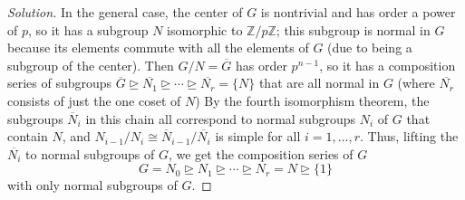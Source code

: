 \documentclass[10pt]{article}
\providecommand{\ol}{\overline}
\providecommand{\ZZ}{\mathbb Z}
\newenvironment{soln}{\begin{proof}[Solution]}{\end{proof}}
\begin{document}
\begin{soln}
    In the general case, the center of $G$ is nontrivial
    and has order a power of $p$, so it has a subgroup $N$
    isomorphic to $\ZZ/p\ZZ$; this subgroup is normal in $G$
    because its elements commute with all the elements of $G$
    (due to being a subgroup of the center).
    Then $G/N = \ol G$ has order $p^{n-1}$, so it has a composition series
    of subgroups
    $\ol G\trianglerighteq\ol{N_1}\trianglerighteq\cdots\trianglerighteq\ol{N_r}=\{N\}$
    that are all normal in $G$ (where $\ol{N_r}$ consists of just the one coset of $N$)
    By the fourth isomorphism theorem, the subgroups $\ol N_i$ in this chain
    all correspond to normal subgroups $N_i$ of $G$ that contain $N$,
    and $N_{i-1}/N_i\cong \ol N_{i-1}/\ol{N_i}$ is simple for all $i=1,\dots,r$.
    Thus, lifting the $\ol{N_i}$ to normal subgroups of $G$,
    we get the composition series of $G$
    \begin{equation*}
        G = N_0\trianglerighteq N_1\trianglerighteq \cdots
	\trianglerighteq N_r = N \trianglerighteq \{1\}
    \end{equation*}
    with only normal subgroups of $G$.
\end{soln}
\end{document}
